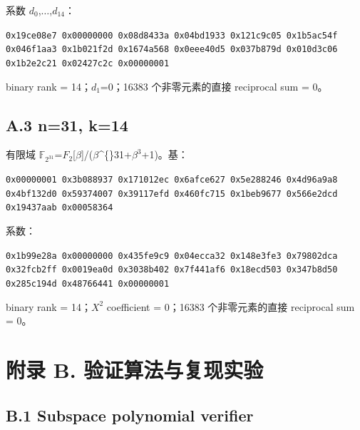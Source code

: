\documentclass[11pt]{ctexart}
\begin{document}
系数 \ensuremath{d_0},\ensuremath{\ldots},\ensuremath{d_{14}}：

\begin{center}\begin{minipage}{0.95\linewidth}\small \texttt{0x19ce08e7 0x00000000 0x08d8433a 0x04bd1933 0x121c9c05 0x1b5ac54f 0x046f1aa3 0x1b021f2d 0x1674a568 0x0eee40d5 0x037b879d 0x010d3c06 0x1b2e2c21 0x02427c2c 0x00000001}\end{minipage}\end{center}

binary rank = 14；\ensuremath{d_1}=0；16383 个非零元素的直接 reciprocal sum = 0。

\subsection{A.3 n=31, k=14}

有限域 \ensuremath{\mathbb F_{2^31}}=\ensuremath{F_2}[\ensuremath{\beta}]/(\ensuremath{\beta}\textasciicircum\{\}31+\ensuremath{\ensuremath{\beta}^3}+1)。基：

\begin{center}\begin{minipage}{0.95\linewidth}\small \texttt{0x00000001 0x3b088937 0x171012ec 0x6afce627 0x5e288246 0x4d96a9a8 0x4bf132d0 0x59374007 0x39117efd 0x460fc715 0x1beb9677 0x566e2dcd 0x19437aab 0x00058364}\end{minipage}\end{center}

系数：

\begin{center}\begin{minipage}{0.95\linewidth}\small \texttt{0x1b99e28a 0x00000000 0x435fe9c9 0x04ecca32 0x148e3fe3 0x79802dca 0x32fcb2ff 0x0019ea0d 0x3038b402 0x7f441af6 0x18ecd503 0x347b8d50 0x285c194d 0x48766441 0x00000001}\end{minipage}\end{center}

binary rank = 14；\ensuremath{X^2} coefficient = 0；16383 个非零元素的直接 reciprocal sum = 0。

\section{附录 B. 验证算法与复现实验}

\subsection{B.1 Subspace polynomial verifier}
\end{document}
